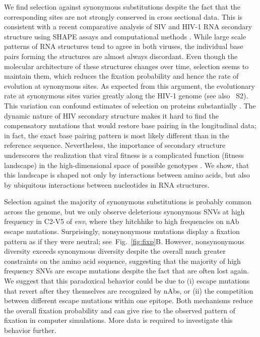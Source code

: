 \documentclass[11pt]{article}
\newcommand{\FIG}[1]{Fig.~\ref{fig:#1}}
\newcommand{\env}{\textit{env}}
\newcommand{\shankaregion}{C2-V5}
\newcommand{\syndiv}{2}
\begin{document}
We find selection against synonymous substitutions despite the
fact that the corresponding sites are not strongly conserved in
cross sectional data. This is consistent with a recent comparative
analysis of SIV and HIV-1 RNA secondary structure using SHAPE assays and
computational methods \citep{pollom_comparison_2013}. While large scale
patterns of RNA structures tend to agree in both viruses, the individual
base pairs forming the structures are almost always
discordant. Even though the molecular architecture of these structures
changes over time, selection seems to maintain them, which reduces the
fixation probability and hence the rate of evolution at synonymous
sites. As expected from this argument, the evolutionary rate
at synonymous sites varies greatly along the HIV-1 genome
\citep{mayrose_towards_2007} (see also \figurename~S\syndiv). This variation can confound estimates of
selection on proteins substantially \citep{ngandu_extensive_2008}. 
The dynamic nature of HIV secondary structure makes it hard to find the 
compensatory mutations that would restore base pairing in the
longitudinal data; in fact, the exact base pairing pattern is
most likely different than in the reference sequence. Nevertheless, the
importance of secondary structure underscores the realization that viral
fitness is a complicated function (fitness landscape) in the
high-dimensional space of possible genotypes
\citep{ferguson_translating_2013}. We show, that this landscape is shaped not
only by interactions between amino acids, but also by ubiquitous
interactions between nucleotides in RNA structures. 


Selection against the majority of synonymous substitutions is probably
common across the genome, but we only observe deleterious synonymous SNVs
at high frequency in \shankaregion{} of \env{}, where they hitchhike to
high frequencies on nAb escape mutations. Surprisingly, nonsynonymous
mutations display a fixation pattern as if they were neutral;
see~\FIG{fixp}B. However, nonsynonymous diversity exceeds
synonymous diversity despite the overall much greater constraints on the
amino acid sequence, suggesting that the majority of high frequency SNVs
are escape mutations despite the fact that are often lost again. We suggest that this
paradoxical behavior could be due to (i) escape
mutations that revert after they themselves are recognized by nAbs, or (ii)
the competition between different escape mutations within one epitope. 
Both mechanisms reduce the overall fixation probability and can
give rise to the observed pattern of fixation in computer
simulations. More data is required to investigate this behavior further.
\end{document}
